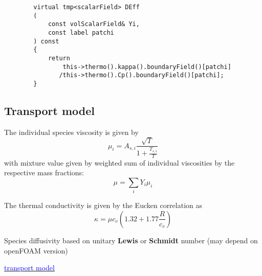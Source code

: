 \documentclass[a4paper, 12pt]{article}
\numberwithin{equation}{section}
\newcommand{\blue}[1]{\textcolor{blue}{#1}}
\begin{document}
    {
    \begin{verbatim}
        virtual tmp<scalarField> DEff
        (
            const volScalarField& Yi,
            const label patchi
        ) const
        {
            return
                this->thermo().kappa().boundaryField()[patchi]
               /this->thermo().Cp().boundaryField()[patchi];
        }
    \end{verbatim}
    }

    \subsection{Transport model}

        The individual species viscosity is given by
        \begin{equation}
            \mu_i = A_{s,i} \frac{\sqrt{T}}{1 + \frac{T_{s,i}}{T}}
        \end{equation}
        with mixture value given by weighted sum of individual viscosities by the respective mass fractions:
        \begin{equation}
            \mu = \sum_i Y_i \mu_i
        \end{equation}

        The thermal conductivity is given by the Eucken correlation as
        \begin{equation}
            \kappa = \mu c_v \left( 1.32 + 1.77 \frac{R}{c_v} \right)
        \end{equation}

        Species diffusivity based on unitary \textbf{Lewis} or \textbf{Schmidt} number (may depend on openFOAM version)

        \href{
        https://pure.tue.nl/ws/portalfiles/portal/305474394/1013373-Neural\_Network\_Hydrogen\_Combustion\_Modelling.pdf
        }{\blue{transport model}}
\end{document}
